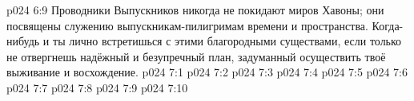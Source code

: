 \vs p024 6:9 \pc Проводники Выпускников никогда не покидают миров Хавоны; они посвящены служению выпускникам\hyp{}пилигримам времени и пространства. Когда\hyp{}нибудь и ты лично встретишься с этими благородными существами, если только не отвергнешь надёжный и безупречный план, задуманный осуществить твоё выживание и восхождение.
\vs p024 7:1 
\vs p024 7:2 
\vs p024 7:3 
\vs p024 7:4 \pc 
\vs p024 7:5 
\vs p024 7:6 
\vs p024 7:7 \pc 
\vs p024 7:8 \pc 
\vs p024 7:9 
\vsetoff
\vs p024 7:10 
\quizlink
